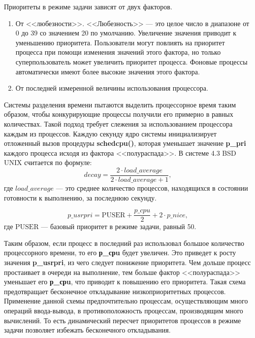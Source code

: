 \documentclass{bmstu}
\begin{document}
Приоритеты в режиме задачи зависят от двух факторов.
\begin{enumerate}
\item От <<любезности>>. 
<<Любезность>> --- это целое число в диапазоне от 0 до 39 со значением 20 по умолчанию. 
Увеличение значения приводит к уменьшению приоритета. 
Пользователи могут повлиять на приоритет процесса при помощи изменения значений этого фактора, но только суперпользователь может увеличить приоритет процесса. 
Фоновые процессы автоматически имеют более высокие значения этого фактора.
\item От последней измеренной величины использования процессора.
\end{enumerate}

Системы разделения времени пытаются выделить процессорное время таким образом, чтобы конкурирующие процессы получили его примерно в равных количествах. 
Такой подход требует слежения за использованием процессора каждым из процессов. 
Каждую секунду ядро системы инициализирует отложенный вызов процедуры \textbf{schedcpu()}, которая уменьшает значение \textbf{p\_pri} каждого процесса исходя из фактора <<полураспада>>. В системе 4.3 BSD UNIX считается по формуле:
\begin{equation}
decay = \frac{2 \cdot load\_average}{2 \cdot load\_average + 1},
\end{equation}
где $load\_average$ --- это среднее количество процессов, находящихся в состоянии готовности к выполнению, за последнюю секунду.

\begin{equation}
p\_usrpri = \mbox{PUSER} + \frac{p\_cpu}{2} + 2 \cdot p\_nice,
\end{equation}
где $\mbox{PUSER}$ --- базовый приоритет в режиме задачи, равный 50.

Таким образом, если процесс в последний раз использовал большое количество процессорного времени, то его \textbf{р\_срu} будет увеличен. 
Это приведет к росту значения \textbf{p\_usrpri}, из чего следует понижение приоритета. 
Чем дольше процесс простаивает в очереди на выполнение, тем больше фактор <<полураспада>> уменьшает его \textbf{р\_срu}, что приводит к повышению его приоритета. 
Такая схема предотвращает бесконечное откладывание низкоприоритетных процессов. 
Применение данной схемы предпочтительно процессам, осуществляющим много операций ввода-вывода, в противоположность процессам, производящим много вычислений. 
То есть динамический пересчет приоритетов процессов в режиме задачи позволяет избежать бесконечного откладывания.
\end{document}
